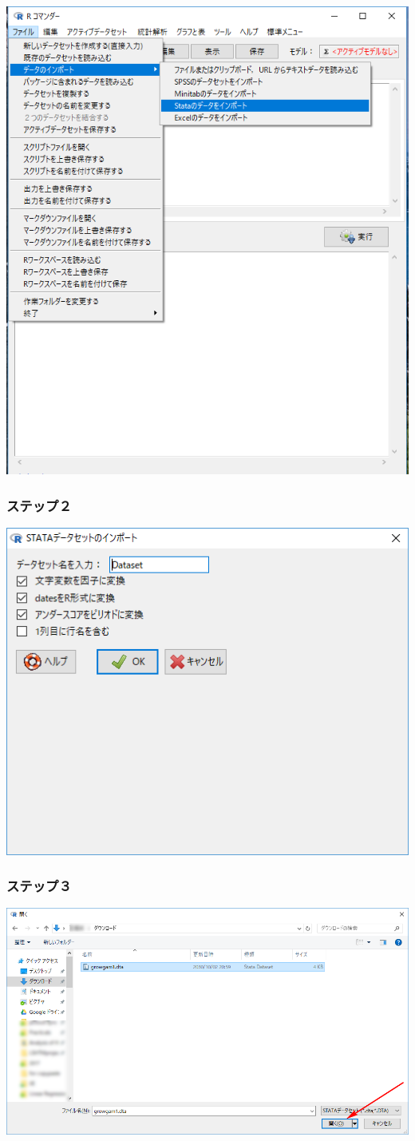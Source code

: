 \documentclass[11pt,]{problemset}
\begin{document}
\begin{center}\includegraphics[width=0.8\linewidth]{pic/import00} \end{center}

\subsubsection{ステップ２}\label{-1}

\begin{center}\includegraphics[width=0.5\linewidth]{pic/import02} \end{center}

\subsubsection{ステップ３}\label{-2}

\begin{center}\includegraphics[width=0.7\linewidth]{pic/import03} \end{center}
\end{document}
